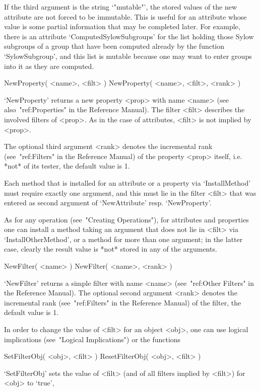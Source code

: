 If the third argument is the string `"mutable"', the stored values of the
new attribute are not forced to be immutable.
This is useful for an attribute whose value is some partial information
that may be completed later.
For example, there is an attribute `ComputedSylowSubgroups' for the list
holding those Sylow subgroups of a group that have been computed already
by the function `SylowSubgroup',
and this list is mutable because one may want to enter groups into it
as they are computed.

\>NewProperty( <name>, <filt> )
\)NewProperty( <name>, <filt>, <rank> )

`NewProperty' returns a new property <prop> with name <name>
(see also~"ref:Properties" in the Reference Manual).
The filter <filt> describes the involved filters of <prop>.
As in the case of attributes, <filt> is not implied by <prop>.

The optional third argument <rank> denotes the incremental rank
(see~"ref:Filters" in the Reference Manual) of the property <prop> itself,
i.e. *not* of its tester, the default value is 1.

Each method that is installed for an attribute or a property
via `InstallMethod' must require exactly one argument,
and this must lie in the filter <filt> that was entered as second
argument of `NewAttribute' resp. `NewProperty'.

As for any operation (see~"Creating Operations"),
for attributes and properties one can install a method taking an argument
that does not lie in <filt> via `InstallOtherMethod',
or a method for more than one argument;
in the latter case,
clearly the result value is *not* stored in any of the arguments.



\>NewFilter( <name> )
\)NewFilter( <name>, <rank> )

`NewFilter' returns a simple filter with name <name>
(see~"ref:Other Filters" in the Reference Manual).
The optional second argument <rank> denotes the incremental rank
(see~"ref:Filters" in the Reference Manual) of the filter,
the default value is 1.

In order to change the value of <filt> for an object <obj>,
one can use logical implications (see~"Logical Implications") or
the functions

\>SetFilterObj( <obj>, <filt> )
\>ResetFilterObj( <obj>, <filt> )

`SetFilterObj' sets the value of <filt> (and of all filters implied by
<filt>) for <obj> to `true',

